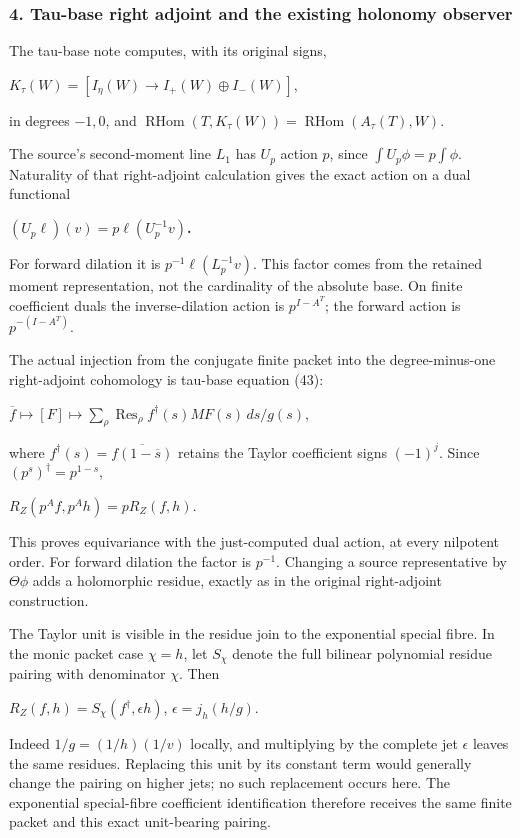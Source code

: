 \subsubsection{4. Tau-base right adjoint and the existing holonomy observer}\label{endpoint-f1_scaling--tau-base-right-adjoint-and-the-existing-holonomy-observer}

The tau-base note computes, with its original signs,

\(K_\tau(W)=[I_\eta(W) \to  I_+(W) \oplus I_-(W)]\),

in degrees \(-1,0\), and \(\operatorname{RHom}(T,K_\tau(W))=\operatorname{RHom}(A_\tau(T),W)\).

The source's second-moment line \(L_1\) has \(U_p\) action \(p\), since \(\int U_p \phi=p \int \phi\). Naturality of that right-adjoint calculation gives the exact action on a dual functional

\textbf{\((U_p \ell)(v)=p \ell(U_p^{-1}v)\).}

For forward dilation it is \(p^{-1}\ell(L_p^{-1}v)\). This factor comes from the retained moment representation, not the cardinality of the absolute base. On finite coefficient duals the inverse-dilation action is \(p^{I-A^T}\); the forward action is \(p^{-(I-A^T)}\).

The actual injection from the conjugate finite packet into the degree-minus-one right-adjoint cohomology is tau-base equation (43):

\(\overline f\mapsto [F]\mapsto\sum_\rho\operatorname{Res}_\rho f^\dagger(s)MF(s)\,ds/g(s)\),

where \(f^\dagger(s)=\overline{f(1-\overline{s})}\) retains the Taylor coefficient signs \((-1)^j\). Since \((p^s)^\dagger=p^{1-s}\),

\(R_Z(p^A f,p^A h)=p R_Z(f,h)\).

This proves equivariance with the just-computed dual action, at every nilpotent order. For forward dilation the factor is \(p^{-1}\). Changing a source representative by \(\Theta \phi\) adds a holomorphic residue, exactly as in the original right-adjoint construction.

The Taylor unit is visible in the residue join to the exponential special fibre. In the monic packet case \(\chi=h\), let \(S_\chi\) denote the full bilinear polynomial residue pairing with denominator \(\chi\). Then

\(R_Z(f,h)=S_\chi(f^\dagger,\epsilon h)\), \(\epsilon=j_h(h/g)\).

Indeed \(1/g=(1/h)(1/v)\) locally, and multiplying by the complete jet \(\epsilon\) leaves the same residues. Replacing this unit by its constant term would generally change the pairing on higher jets; no such replacement occurs here. The exponential special-fibre coefficient identification therefore receives the same finite packet and this exact unit-bearing pairing.


